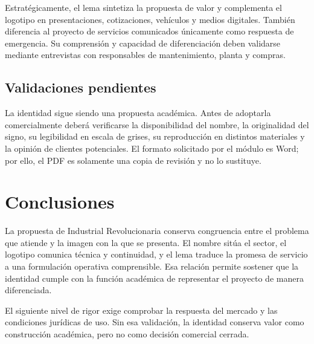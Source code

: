 {Estratégicamente, el lema sintetiza la propuesta de valor y complementa el logotipo en presentaciones, cotizaciones, vehículos y medios digitales. También diferencia al proyecto de servicios comunicados únicamente como respuesta de emergencia. Su comprensión y capacidad de diferenciación deben validarse mediante entrevistas con responsables de mantenimiento, planta y compras.

\subsection{Validaciones pendientes}

La identidad sigue siendo una propuesta académica. Antes de adoptarla comercialmente deberá verificarse la disponibilidad del nombre, la originalidad del signo, su legibilidad en escala de grises, su reproducción en distintos materiales y la opinión de clientes potenciales. El formato solicitado por el módulo es Word; por ello, el PDF es solamente una copia de revisión y no lo sustituye.

\section{Conclusiones}

La propuesta de Industrial Revolucionaria conserva congruencia entre el problema que atiende y la imagen con la que se presenta. El nombre sitúa el sector, el logotipo comunica técnica y continuidad, y el lema traduce la promesa de servicio a una formulación operativa comprensible. Esa relación permite sostener que la identidad cumple con la función académica de representar el proyecto de manera diferenciada.

El siguiente nivel de rigor exige comprobar la respuesta del mercado y las condiciones jurídicas de uso. Sin esa validación, la identidad conserva valor como construcción académica, pero no como decisión comercial cerrada.
}
